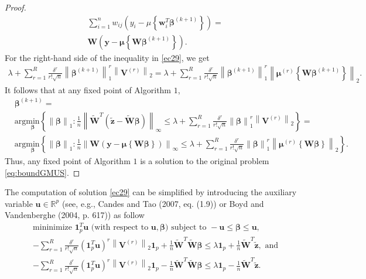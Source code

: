 \documentclass[a4paper,12pt,openany]{report}
\theoremstyle{plain}
\theoremstyle{plain}
\theoremstyle{plain}
\theoremstyle{plain}
\theoremstyle{plain}
\theoremstyle{plain}
\theoremstyle{plain}
\theoremstyle{plain}
\theoremstyle{plain}
\theoremstyle{plain}
\theoremstyle{plain}
\theoremstyle{plain}
\begin{document}
\begin{proof}
\begin{align*}
	&\sum_{i=1}^{n} w_{ij} \left(y_{i} -  \mu\left\{ \mathbf{w}_{i}^{T}\boldsymbol{\beta}^{(k+1)}\right\}\right) = \\
	&\mathbf{W} \left(\mathbf{y} - \boldsymbol{\mu}\left\{\mathbf{W}\boldsymbol{\beta}^{(k+1)} \right\} \right).
	\end{align*}
	For the right-hand side of the inequality in \eqref{ec29}, we get
	\begin{align*}
	\lambda + \sum_{r=1}^{R}\frac{\delta^{r}}{r! \sqrt{n}} \left\|\boldsymbol{\beta}^{(k+1)}\right\|_{1}^{r}\left\| \mathbf{V}^{(r)}\right\|_{2} = \lambda + \sum_{r=1}^{R}\frac{\delta^{r}}{r! \sqrt{n}} \left\|\boldsymbol{\beta}^{(k+1)}\right\|_{1}^{r}\left\| \boldsymbol{\mu}^{(r)}\left\{\mathbf{W}\boldsymbol{\beta}^{(k+1)} \right\}\right\|_{2} .
	\end{align*}
	It follows that at any fixed point of Algorithm $1$, 
	\begin{align*}
	&\boldsymbol{\beta}^{(k+1)} = \\ 
	&\text{arg}\underset{\boldsymbol{\beta}}{\text{min}}\left\{ \left\| \boldsymbol{\beta}\right\|_{1}: \frac{1}{n}\left\|\tilde{\mathbf{W}}^{T}\left(\tilde{\mathbf{z}} - \tilde{\mathbf{W}}\boldsymbol{\beta}\right) \right\|_{\infty} \leq \lambda + \sum_{r=1}^{R} \frac{\delta^{r} }{r! \sqrt{n}} \left\|\boldsymbol{\beta}\right\|_{1}^{r}\left\| \mathbf{V}^{(r)}\right\|_{2}\right\} = \\
	&\text{arg}\underset{\boldsymbol{\beta}}{\text{min}}\left\{ \left\| \boldsymbol{\beta}\right\|_{1}: \frac{1}{n}\left\|\mathbf{W} \left(\mathbf{y} - \boldsymbol{\mu}\left\{\mathbf{W}\boldsymbol{\beta} \right\} \right) \right\|_{\infty} \leq \lambda + \sum_{r=1}^{R}\frac{\delta^{r}}{r! \sqrt{n}} \left\|\boldsymbol{\beta}\right\|_{1}^{r}\left\| \boldsymbol{\mu}^{(r)}\left\{\mathbf{W}\boldsymbol{\beta} \right\}\right\|_{2}\right\}.
	\end{align*}
	Thus, any fixed point of Algorithm $1$ is a solution to the original problem \eqref{eq:boundGMUS}.
\end{proof}
The computation of solution  \eqref{ec29} can be simplified 
 by introducing the auxiliary variable $\mathbf{u}\in\mathbb{R}^p$ (see, e.g., Candes and
Tao (2007, eq. (1.9)) or Boyd and Vandenberghe (2004, p. 617)) as follow 
\begin{align*}
&\text{mininimize } \mathbf{1}_{p}^{T} \mathbf{u} \text{ (with respect to } \mathbf{u}, \boldsymbol{\beta} \text{)}
\text{ subject to } -\mathbf{u} \leq \boldsymbol{\beta} \leq \mathbf{u}, \\
&-\sum_{r=1}^{R} \frac{\delta^{r}}{r! \sqrt{n}} \left(\mathbf{1}_{p}^{T} \mathbf{u}\right)^{r}\left\|\mathbf{V}^{(r)}\right\|_{2} \mathbf{1}_{p}+ \frac{1}{n}\tilde{\mathbf{W}}^{T}\tilde{\mathbf{W}} \boldsymbol{\beta} \leq  \lambda\mathbf{1}_{p} + \frac{1}{n}\tilde{\mathbf{W}}^{T} \tilde{\mathbf{z}},\text{ and}\\
&-\sum_{r=1}^{R} \frac{\delta^{r}}{r! \sqrt{n}} \left(\mathbf{1}_{p}^{T} \mathbf{u}\right)^{r}\left\|\mathbf{V}^{(r)}\right\|_{2}\mathbf{1}_{p}- \frac{1}{n}\tilde{\mathbf{W}}^{T}\tilde{\mathbf{W}} \boldsymbol{\beta} \leq 
\lambda \mathbf{1}_{p}- \frac{1}{n}\tilde{\mathbf{W}}^{T} \tilde{\mathbf{z}}.
\end{align*}
\end{document}
